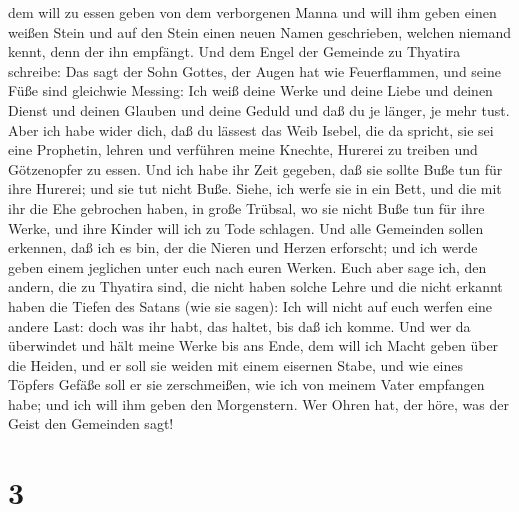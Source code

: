 dem will zu essen geben von dem verborgenen Manna und will ihm geben
einen weißen Stein und auf den Stein einen neuen Namen geschrieben,
welchen niemand kennt, denn der ihn empfängt.  Und dem
Engel der Gemeinde zu Thyatira schreibe: Das sagt der Sohn Gottes, der
Augen hat wie Feuerflammen, und seine Füße sind gleichwie Messing:
 Ich weiß deine Werke und deine Liebe und deinen Dienst und
deinen Glauben und deine Geduld und daß du je länger, je mehr tust.
 Aber ich habe wider dich, daß du lässest das Weib Isebel,
die da spricht, sie sei eine Prophetin, lehren und verführen meine
Knechte, Hurerei zu treiben und Götzenopfer zu essen.  Und
ich habe ihr Zeit gegeben, daß sie sollte Buße tun für ihre Hurerei; und
sie tut nicht Buße.  Siehe, ich werfe sie in ein Bett, und
die mit ihr die Ehe gebrochen haben, in große Trübsal, wo sie nicht Buße
tun für ihre Werke,  und ihre Kinder will ich zu Tode
schlagen. Und alle Gemeinden sollen erkennen, daß ich es bin, der die
Nieren und Herzen erforscht; und ich werde geben einem jeglichen unter
euch nach euren Werken.  Euch aber sage ich, den andern,
die zu Thyatira sind, die nicht haben solche Lehre und die nicht erkannt
haben die Tiefen des Satans (wie sie sagen): Ich will nicht auf euch
werfen eine andere Last:  doch was ihr habt, das haltet,
bis daß ich komme.  Und wer da überwindet und hält meine
Werke bis ans Ende, dem will ich Macht geben über die Heiden,
 und er soll sie weiden mit einem eisernen Stabe, und wie
eines Töpfers Gefäße soll er sie zerschmeißen,  wie ich von
meinem Vater empfangen habe; und ich will ihm geben den Morgenstern.
 Wer Ohren hat, der höre, was der Geist den Gemeinden sagt!

\hypertarget{section-2}{%
\section{3}\label{section-2}}

